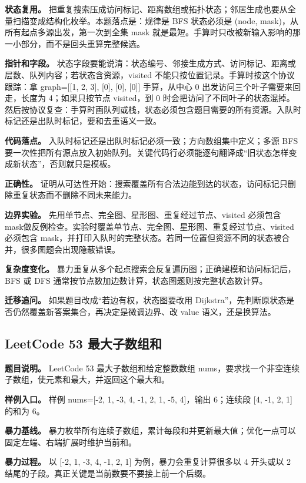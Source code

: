 \textbf{状态复用。} 把重复搜索压成访问标记、距离数组或拓扑状态；邻居生成也要从全量扫描变成结构化枚举。本题落点是：规律是 BFS 状态必须是 (node, mask)，从所有起点多源出发，第一次到全集 mask 就是最短。手算时只改被新输入影响的那一小部分，而不是回头重算完整候选。

\textbf{指针和字段。} 状态字段要能说清：状态编号、邻接生成方式、访问标记、距离或层数、队列内容；若状态含资源，visited 不能只按位置记录。手算时按这个协议跟踪：拿 graph=[[1, 2, 3], [0], [0], [0]] 手算，从中心 0 出发访问三个叶子需要来回走，长度为 4；如果只按节点 visited，到 0 时会把访问了不同叶子的状态混掉。然后按协议复查：手算时画队列或栈，状态必须包含题目需要的所有资源。入队时标记还是出队时标记，要和去重语义一致。

\textbf{代码落点。} 入队时标记还是出队时标记必须一致；方向数组集中定义；多源 BFS 要一次性把所有源点放入初始队列。关键代码行必须能逐句翻译成“旧状态怎样变成新状态”，否则就只是模板。

\textbf{正确性。} 证明从可达性开始：搜索覆盖所有合法边能到达的状态，访问标记只删除重复状态而不删除不同未来能力。

\textbf{边界实验。} 先用单节点、完全图、星形图、重复经过节点、visited 必须包含 mask做反例检查。实验时覆盖单节点、完全图、星形图、重复经过节点、visited 必须包含 mask，并打印入队时的完整状态。若同一位置但资源不同的状态被合并，很多图题会出现隐蔽错误。

\textbf{复杂度变化。} 暴力重复从多个起点搜索会反复遍历图；正确建模和访问标记后，BFS 或 DFS 通常按节点数加边数计算，状态图题则按完整状态数计算。

\textbf{迁移追问。} 如果题目改成“若边有权，状态图要改用 Dijkstra”，先判断原状态是否仍然覆盖新答案集合，再决定是微调边界、改 value 语义，还是换算法。

\subsection{LeetCode 53 最大子数组和}

\textbf{题目说明。} LeetCode 53 最大子数组和给定整数数组 nums，要求找一个非空连续子数组，使元素和最大，并返回这个最大和。

\textbf{样例入口。} 样例 nums=[-2, 1, -3, 4, -1, 2, 1, -5, 4]，输出 6；连续段 [4, -1, 2, 1] 的和为 6。

\textbf{暴力基线。} 暴力枚举所有连续子数组，累计每段和并更新最大值；优化一点可以固定左端、右端扩展时维护当前和。

\textbf{暴力过程。} 以 [-2, 1, -3, 4, -1, 2, 1] 为例，暴力会重复计算很多以 4 开头或以 2 结尾的子段。真正关键是当前数要不要接上前一个后缀。

